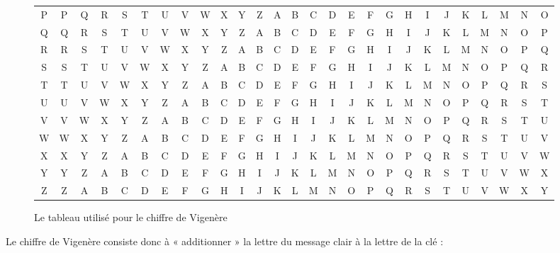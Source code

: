 \begin{figure}[h]
\begin{center}
\begin{tabular}{c|c@{}c@{}c@{}c@{}c@{}c@{}c@{}c@{}c@{}c@{}c@{}c@{}c@{}c@{}c@{}c@{}c@{}c@{}c@{}c@{}c@{}c@{}c@{}c@{}c@{}c}
      P & P & Q & R & S & T & U & V & W & X & Y & Z & A & B & C & D & E & F & G & H & I & J & K & L & M & N & O \\
      Q & Q & R & S & T & U & V & W & X & Y & Z & A & B & C & D & E & F & G & H & I & J & K & L & M & N & O & P \\
      R & R & S & T & U & V & W & X & Y & Z & A & B & C & D & E & F & G & H & I & J & K & L & M & N & O & P & Q \\
      S & S & T & U & V & W & X & Y & Z & A & B & C & D & E & F & G & H & I & J & K & L & M & N & O & P & Q & R \\
      T & T & U & V & W & X & Y & Z & A & B & C & D & E & F & G & H & I & J & K & L & M & N & O & P & Q & R & S \\
      U & U & V & W & X & Y & Z & A & B & C & D & E & F & G & H & I & J & K & L & M & N & O & P & Q & R & S & T \\
      V & V & W & X & Y & Z & A & B & C & D & E & F & G & H & I & J & K & L & M & N & O & P & Q & R & S & T & U \\
      W & W & X & Y & Z & A & B & C & D & E & F & G & H & I & J & K & L & M & N & O & P & Q & R & S & T & U & V \\
      X & X & Y & Z & A & B & C & D & E & F & G & H & I & J & K & L & M & N & O & P & Q & R & S & T & U & V & W \\
      Y & Y & Z & A & B & C & D & E & F & G & H & I & J & K & L & M & N & O & P & Q & R & S & T & U & V & W & X \\
      Z & Z & A & B & C & D & E & F & G & H & I & J & K & L & M & N & O & P & Q & R & S & T & U & V & W & X & Y \\
    \end{tabular}
  \end{center}
  \caption{Le tableau utilisé pour le chiffre de Vigenère}
  \label{fig:VigenereTableau}
\end{figure}

Le chiffre de Vigenère consiste donc à « additionner » la lettre du
message clair à la lettre de la clé : 


